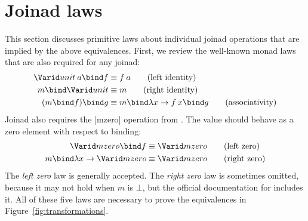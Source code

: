 \documentclass{sigplanconf}
\begin{document}

\section{Joinad laws}
\label{sec:laws}

This section discusses primitive laws about individual joinad operations that are 
implied by the above equivalences. First, we review the well-known monad laws that 
are also required for any joinad:
\begin{align*}
\munit \: a \bind f &\equiv f \: a \tag{left identity} \\
m \bind \munit &\equiv m \tag{right identity} \\
(m \bind f) \bind g &\equiv m \bind \lambda x \rightarrow f \: x \bind g \tag{associativity}
\end{align*}
Joinad also requires the |mzero| operation from . The value should behave as a 
zero element with respect to binding:
\begin{align*}
\mzero \bind f &\equiv \mzero \tag {left zero} \\
m \bind \lambda x \rightarrow \mzero &\equiv \mzero \tag{right zero}
\end{align*}
The \textit{left zero} law is generally accepted. The \textit{right zero} law is sometimes omitted, 
because it may not hold when $m$ is $\bot$, but the official documentation for 
\cite{monadplusdoc} includes it. All of these five laws are necessary to prove the 
equivalences in Figure~\ref{fig:transformations}.

\end{document}
